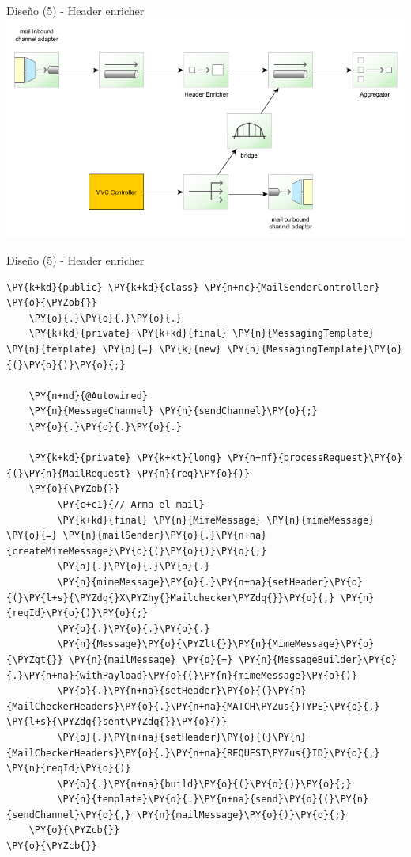 \documentclass{beamer}
\begin{document}
\begin{frame}{Diseño (5) - Header enricher}
\includegraphics[width=1.0\linewidth]{sp-int-07}
\end{frame}


\begin{frame}[fragile]{Diseño (5) - Header enricher}
\begin{Verbatim}[fontsize=\tiny,commandchars=\\\{\}]
\PY{k+kd}{public} \PY{k+kd}{class} \PY{n+nc}{MailSenderController}
\PY{o}{\PYZob{}}
    \PY{o}{.}\PY{o}{.}\PY{o}{.}
    \PY{k+kd}{private} \PY{k+kd}{final} \PY{n}{MessagingTemplate} \PY{n}{template} \PY{o}{=} \PY{k}{new} \PY{n}{MessagingTemplate}\PY{o}{(}\PY{o}{)}\PY{o}{;}

    \PY{n+nd}{@Autowired}
    \PY{n}{MessageChannel} \PY{n}{sendChannel}\PY{o}{;}
    \PY{o}{.}\PY{o}{.}\PY{o}{.}

    \PY{k+kd}{private} \PY{k+kt}{long} \PY{n+nf}{processRequest}\PY{o}{(}\PY{n}{MailRequest} \PY{n}{req}\PY{o}{)}
    \PY{o}{\PYZob{}}
         \PY{c+c1}{// Arma el mail}
         \PY{k+kd}{final} \PY{n}{MimeMessage} \PY{n}{mimeMessage} \PY{o}{=} \PY{n}{mailSender}\PY{o}{.}\PY{n+na}{createMimeMessage}\PY{o}{(}\PY{o}{)}\PY{o}{;}
         \PY{o}{.}\PY{o}{.}\PY{o}{.}
         \PY{n}{mimeMessage}\PY{o}{.}\PY{n+na}{setHeader}\PY{o}{(}\PY{l+s}{\PYZdq{}X\PYZhy{}Mailchecker\PYZdq{}}\PY{o}{,} \PY{n}{reqId}\PY{o}{)}\PY{o}{;}
         \PY{o}{.}\PY{o}{.}\PY{o}{.}
         \PY{n}{Message}\PY{o}{\PYZlt{}}\PY{n}{MimeMessage}\PY{o}{\PYZgt{}} \PY{n}{mailMessage} \PY{o}{=} \PY{n}{MessageBuilder}\PY{o}{.}\PY{n+na}{withPayload}\PY{o}{(}\PY{n}{mimeMessage}\PY{o}{)}
         \PY{o}{.}\PY{n+na}{setHeader}\PY{o}{(}\PY{n}{MailCheckerHeaders}\PY{o}{.}\PY{n+na}{MATCH\PYZus{}TYPE}\PY{o}{,} \PY{l+s}{\PYZdq{}sent\PYZdq{}}\PY{o}{)}
         \PY{o}{.}\PY{n+na}{setHeader}\PY{o}{(}\PY{n}{MailCheckerHeaders}\PY{o}{.}\PY{n+na}{REQUEST\PYZus{}ID}\PY{o}{,} \PY{n}{reqId}\PY{o}{)}
         \PY{o}{.}\PY{n+na}{build}\PY{o}{(}\PY{o}{)}\PY{o}{;}
         \PY{n}{template}\PY{o}{.}\PY{n+na}{send}\PY{o}{(}\PY{n}{sendChannel}\PY{o}{,} \PY{n}{mailMessage}\PY{o}{)}\PY{o}{;}
    \PY{o}{\PYZcb{}}
\PY{o}{\PYZcb{}}

\end{Verbatim}
\end{frame}
\end{document}
